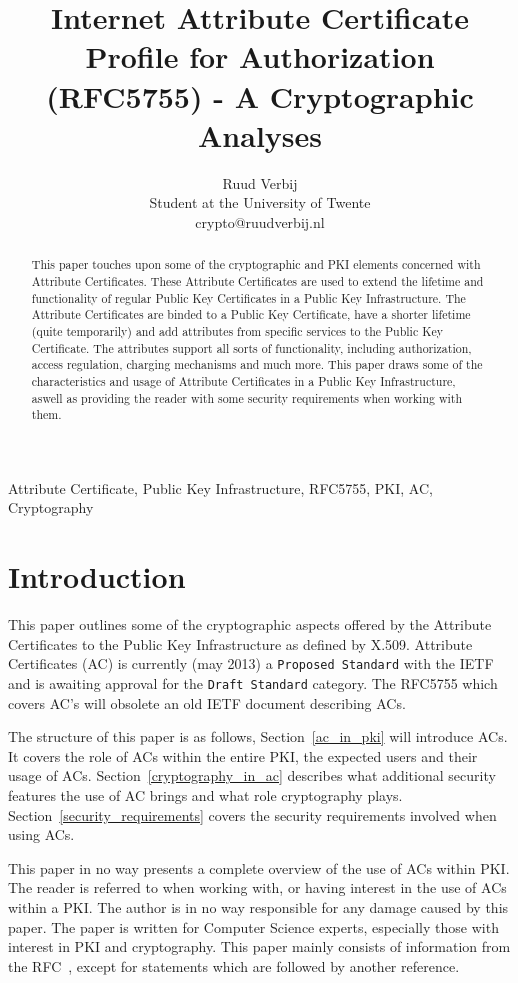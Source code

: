 \documentclass[10pt,conference,a4paper]{IEEEtran}
\title{Internet Attribute Certificate Profile for Authorization (RFC5755) - A Cryptographic Analyses}
\author{Ruud Verbij \\ Student at the University of Twente \\ crypto@ruudverbij.nl}
\begin{document}
\maketitle

\begin{abstract}
This paper touches upon some of the cryptographic and PKI elements concerned with Attribute Certificates. These Attribute Certificates are used to extend the lifetime and functionality of regular Public Key Certificates in a Public Key Infrastructure. The Attribute Certificates are binded to a Public Key Certificate, have a shorter lifetime (quite temporarily) and add attributes from specific services to the Public Key Certificate. The attributes support all sorts of functionality, including authorization, access regulation, charging mechanisms and much more. This paper draws some of the characteristics and usage of Attribute Certificates in a Public Key Infrastructure, aswell as providing the reader with some security requirements when working with them.
\end{abstract}

\begin{IEEEkeywords}
Attribute Certificate, Public Key Infrastructure, RFC5755, PKI, AC, Cryptography
\end{IEEEkeywords}

\section{Introduction}
\label{Introduction}
This paper outlines some of the cryptographic aspects offered by the Attribute Certificates\cite{rfc_ac} to the Public Key Infrastructure as defined by X.509\cite{rfc_x509}. Attribute Certificates (AC) is currently (may 2013) a \texttt{Proposed Standard} with the IETF and is awaiting approval for the \texttt{Draft Standard} category. The RFC5755 which covers AC's will obsolete an old IETF document describing ACs\cite{rfc_oldac}.

The structure of this paper is as follows, Section~\ref{ac_in_pki} will introduce ACs. It covers the role of ACs within the entire PKI, the expected users and their usage of ACs. Section~\ref{cryptography_in_ac} describes what additional security features the use of AC brings and what role cryptography plays. Section~\ref{security_requirements} covers the security requirements involved when using ACs.  

This paper in no way presents a complete overview of the use of ACs within PKI. The reader is referred to \cite{rfc_ac} when working with, or having interest in the use of ACs within a PKI. The author is in no way responsible for any damage caused by this paper. The paper is written for Computer Science experts, especially those with interest in PKI and cryptography. This paper mainly consists of information from the RFC~\cite{rfc_ac}, except for statements which are followed by another reference.
\end{document}
